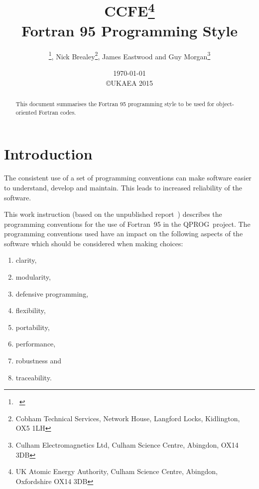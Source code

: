 \documentclass[11pt,twoside,a4paper]{report}
\title {\culhamshorttitle \\ \vspace*{0.5cm}
CCFE\thanks{
UK Atomic Energy Authority,
Culham Science Centre, Abingdon, Oxfordshire OX14 3DB
}
\\ \vspace*{0.5cm}
Fortran 95 Programming Style
}%
\date{\today\\ \vspace*{5.0cm}
\copyright UKAEA 2015\\ \vspace*{1.0cm}
}
\author{\culhamcontactname \thanks{\culhamcontacttel \ \culhamcontactfax},
Nick Brealey\thanks{Cobham Technical Services, Network House, Langford Locks, Kidlington, OX5 1LH},
James Eastwood and Guy Morgan\thanks{Culham Electromagnetics Ltd, Culham Science Centre, Abingdon, OX14 3DB}}
\def\coden{QPROG} %
\begin{document}
\maketitle

\tableofcontents
\cleardoublepage

\setlength{\parindent}{0pt}
\addtolength{\parskip}{0.5\baselineskip}
\setlength{\topsep}{0pt}
\setlength{\itemsep}{0pt}




%
\begin{abstract}
\noindent This document summarises the Fortran 95 programming style to be used
for object-oriented Fortran codes.
\end{abstract}
%

%
\chapter{Introduction}\label{sec:intro}

The consistent use of a set of programming conventions
can make software easier to understand, develop  and maintain.
This leads to increased reliability of the software.

This work instruction (based on the unpublished report~\cite{Ea09Fort})
describes the programming conventions
for the use of Fortran~95 in the \coden\ project.
The programming conventions used have an impact on the following
aspects of the software which should be considered when making choices:
\begin{enumerate}
\setlength{\parsep}{0ex}
\setlength{\itemsep}{0ex}
\item clarity,
\item modularity,
\item defensive programming,
\item flexibility,
\item portability,
\item performance,
\item robustness and
\item traceability.
\end{enumerate}
\end{document}
